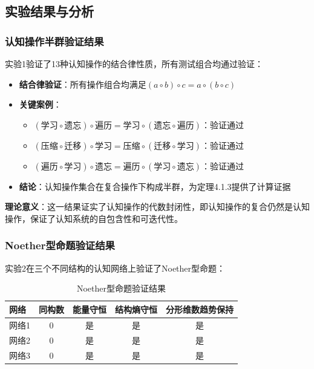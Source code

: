 \documentclass[12pt,a4paper]{article}
\begin{document}
\subsection{实验结果与分析}
\label{subsec:algebraic_results}

\subsubsection{认知操作半群验证结果}
\label{subsubsec:semigroup_results}

实验1验证了13种认知操作的结合律性质，所有测试组合均通过验证：

\begin{itemize}
    \item \textbf{结合律验证}：所有操作组合均满足$(a \circ b) \circ c = a \circ (b \circ c)$
    \item \textbf{关键案例}：
    \begin{itemize}
        \item $(学习 \circ 遗忘) \circ 遍历 = 学习 \circ (遗忘 \circ 遍历)$：验证通过
        \item $(压缩 \circ 迁移) \circ 学习 = 压缩 \circ (迁移 \circ 学习)$：验证通过
        \item $(遍历 \circ 学习) \circ 遗忘 = 遍历 \circ (学习 \circ 遗忘)$：验证通过
    \end{itemize}
    \item \textbf{结论}：认知操作集合在复合操作下构成半群，为定理4.1.3提供了计算证据
\end{itemize}

\textbf{理论意义}：这一结果证实了认知操作的代数封闭性，即认知操作的复合仍然是认知操作，保证了认知系统的自包含性和可迭代性。

\subsubsection{Noether型命题验证结果}
\label{subsubsec:noether_results}

实验2在三个不同结构的认知网络上验证了Noether型命题：

\begin{table}[H]
\centering
\caption{Noether型命题验证结果}
\label{tab:noether_results}
\begin{tabular}{p{2cm}cccc}
\toprule
\textbf{网络} & \textbf{同构数} & \textbf{能量守恒} & \textbf{结构熵守恒} & \textbf{分形维数趋势保持} \\
\midrule
网络1 & 0 & 是 & 是 & 是 \\
网络2 & 0 & 是 & 是 & 是 \\
网络3 & 0 & 是 & 是 & 是 \\
\bottomrule
\end{tabular}
\end{table}
\end{document}
